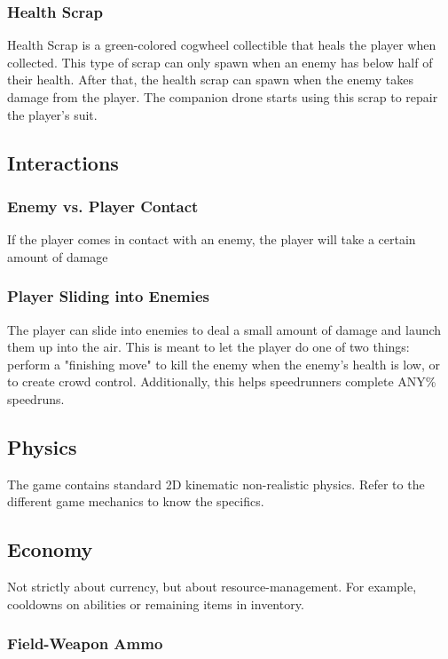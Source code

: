 \documentclass[12pt]{article}
\begin{document}
\subsubsection{Health Scrap}

Health Scrap is a green-colored cogwheel collectible that heals the player when collected. This type of scrap can only spawn when an enemy has below half of their health. After that, the health scrap can spawn when the enemy takes damage from the player. The companion drone starts using this scrap to repair the player's suit. 

\subsection{Interactions}

\subsubsection{Enemy vs. Player Contact}

If the player comes in contact with an enemy, the player will take a certain amount of damage

\subsubsection{Player Sliding into Enemies}

The player can slide into enemies to deal a small amount of damage and launch them up into the air. This is meant to let the player do one of two things: perform a "finishing move" to kill the enemy when the enemy's health is low, or to create crowd control. Additionally, this helps speedrunners complete ANY\% speedruns. 

\subsection{Physics}

The game contains standard 2D kinematic non-realistic physics. Refer to the different game mechanics to know the specifics.

\subsection{Economy}

Not strictly about currency, but about resource-management. For example, cooldowns on abilities or remaining items in inventory. 

\subsubsection{Field-Weapon Ammo}
\end{document}

